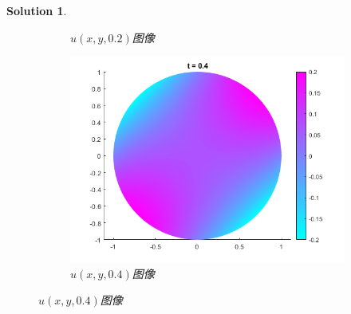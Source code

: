 \documentclass[a4paper, 12pt]{ctexart}
\theoremstyle{plain}
\theoremstyle{plain}
\theoremstyle{plain}
\theoremstyle{nonumberplain}
\newtheorem{solution}{Solution}
\begin{document}
\begin{solution}
\begin{figure}[H]
\begin{subfigure}[b]{0.30\textwidth}
                \caption{$u(x,y,0.2)$图像}
            \end{subfigure}
            \hfill
            \begin{subfigure}[b]{0.30\textwidth}
                \centering
                \includegraphics[width=\textwidth]{wc24.png}
                \caption{$u(x,y,0.4)$图像}
            \end{subfigure}
            

\end{figure}
\end{solution}
\end{document}
